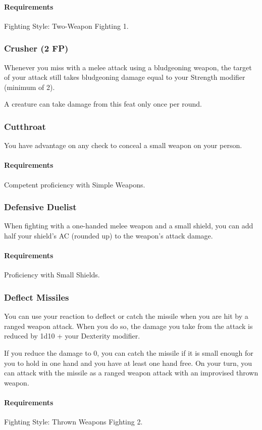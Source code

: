     \paragraph{Requirements} Fighting Style: Two-Weapon Fighting 1.
\subsubsection{Crusher (2 FP)} \label{feat::crusher}
    Whenever you miss with a melee attack using a bludgeoning weapon, the target of your attack still takes bludgeoning damage equal to your Strength modifier (minimum of 2).

    A creature can take damage from this feat only once per round.
\subsubsection{Cutthroat} \label{feat::cutthroat}
    You have advantage on any check to conceal a small weapon on your person.
    \paragraph{Requirements} Competent proficiency with Simple Weapons.
\subsubsection{Defensive Duelist} \label{feat::defensiveduelist}
    When fighting with a one-handed melee weapon and a small shield, you can add half your shield's AC (rounded up) to the weapon's attack damage.
    \paragraph{Requirements} Proficiency with Small Shields.
\subsubsection{Deflect Missiles} \label{feat::deflectmissiles}
    You can use your reaction to deflect or catch the missile when you are hit by a ranged weapon attack.
    When you do so, the damage you take from the attack is reduced by 1d10 + your Dexterity modifier.

    If you reduce the damage to 0, you can catch the missile if it is small enough for you to hold in one hand and you have at least one hand free.
    On your turn, you can attack with the missile as a ranged weapon attack with an improvised thrown weapon.
    \paragraph{Requirements} Fighting Style: Thrown Weapons Fighting 2.
